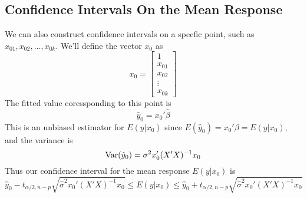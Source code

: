 \subsection{Confidence Intervals On the Mean Response}
\renewcommand{\arraystretch}{1.25}
We can also construct confidence intervals on a specfic point, such as $x_{01},x_{02}, \ldots, x_{0k}$. We'll define the vector $x_0$ as 
\[x_0 = \begin{bmatrix}
    1 \\ x_{01} \\ x_{02} \\ \vdots \\ x_{0k}
\end{bmatrix}\]
The fitted value coressponding to this point is 
\[\hat{y}_0 = x_0'\hat{\beta}\]
This is an unbiased estimator for $E(y|x_0)$ since $E(\hat{y}_0) = x_0'\beta = E(y|x_0)$, and the variance is 
\[\operatorname{Var}(\hat{y}_0) = \sigma^2x_0'(X'X)^{-1}x_0\]
Thus our confidence interval for the mean response $E(y|x_0)$ is 
\[\hat{y}_0 - t_{\alpha/2,n-p}\sqrt{\hat{\sigma}^2x_0'(X'X)^{-1}x_0} \leq E(y|x_0) \leq \hat{y}_0 + t_{\alpha/2,n-p}\sqrt{\hat{\sigma}^2x_0'(X'X)^{-1}x_0}\]
